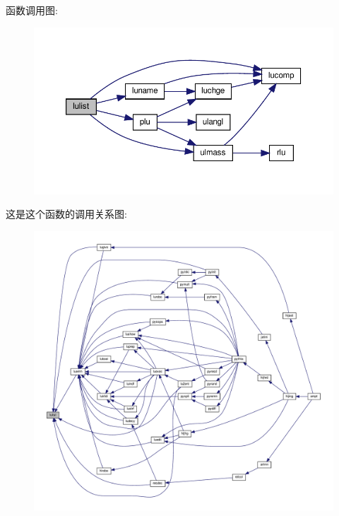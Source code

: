 函数调用图\+:
\nopagebreak
\begin{figure}[H]
\begin{center}
\leavevmode
\includegraphics[width=350pt]{lulist_8f90_ab95a54f990764c2ff10691733fcdda7d_cgraph}
\end{center}
\end{figure}
这是这个函数的调用关系图\+:
\nopagebreak
\begin{figure}[H]
\begin{center}
\leavevmode
\includegraphics[width=350pt]{lulist_8f90_ab95a54f990764c2ff10691733fcdda7d_icgraph}
\end{center}
\end{figure}
